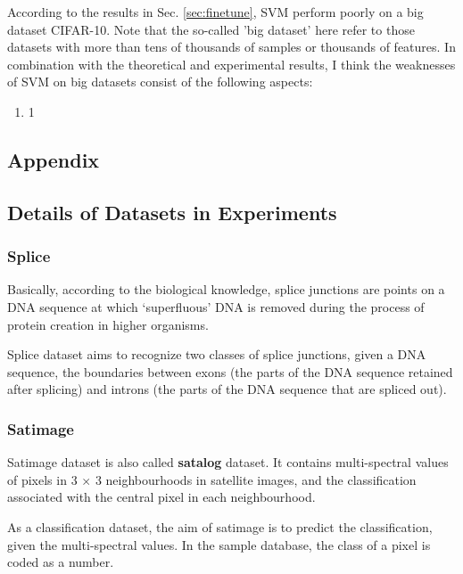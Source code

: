 \documentclass[12pt,a4paper]{article}
\theoremstyle{definition}
\begin{document}
According to the results in Sec. \ref{sec:finetune}, SVM perform poorly on a big dataset CIFAR-10. Note that the so-called 'big dataset' here refer to those datasets with more than tens of thousands of samples or thousands of features. In combination with the theoretical and experimental results, I think the weaknesses of SVM on big datasets consist of the following aspects:

\begin{enumerate}
	\item 1
\end{enumerate}

\newpage
\begin{appendix}
\section{Appendix}

\subsection{Details of Datasets in Experiments}
\label{apd:dataset}

\subsubsection{Splice \cite{splice}}

Basically, according to the biological knowledge, splice junctions are points on a DNA sequence at which `superfluous' DNA is removed during the process of protein creation in higher organisms.

\vspace{0.01\linewidth}
Splice dataset aims to recognize two classes of splice junctions, given a DNA sequence, the boundaries between exons (the parts of the DNA sequence retained after splicing) and introns (the parts of the DNA sequence that are spliced out).

\subsubsection{Satimage \cite{satimage}}

Satimage dataset is also called \textbf{satalog} dataset. It contains multi-spectral values of pixels in 3 $\times$ 3 neighbourhoods in satellite images, and the classification associated with the central pixel in each neighbourhood.

\vspace{0.01\linewidth}
As a classification dataset, the aim of satimage is to predict the classification, given the multi-spectral values. In the sample database, the class of a pixel is coded as a number.


\end{appendix}
\end{document}
